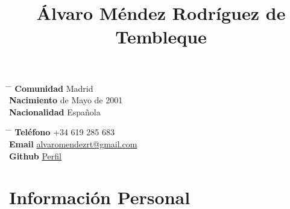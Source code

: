 \documentclass[10pt]{article} %
\begin{document}

\title{Álvaro Méndez Rodríguez de Tembleque } %


\parbox{0.5\textwidth}{ %
  \begin{tabbing} %
    \hspace{3cm} \= \hspace{4cm} \= \kill %
    {\bf Comunidad} \> Madrid\\ %
    {\bf Nacimiento}  de Mayo de 2001 \\ %
    {\bf Nacionalidad} \> Española %
  \end{tabbing}}
\hfill %
\parbox{0.5\textwidth}{ %
  \begin{tabbing} %
    \hspace{3cm} \= \hspace{4cm} \= \kill %
    {\bf Teléfono} \> +34 619 285 683 \\ %
    {\bf Email} \> \href{mailto:alvaromendezrt@gmail.com}{alvaromendezrt@gmail.com} \\ %
    {\bf Github} \> \href{https://github.com/PhyAMR}{Perfil} \\ %
  \end{tabbing}}
  \vspace{-5mm}

\section{Información Personal}
\end{document}
